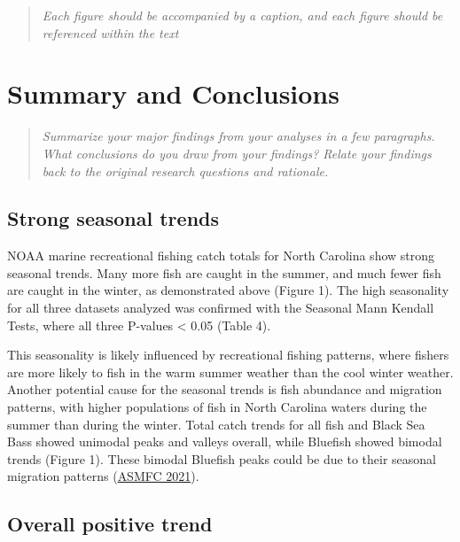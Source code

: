 \documentclass[
  12pt,
]{article}
\begin{document}
\begin{quote}
\emph{Each figure should be accompanied by a caption, and each figure
should be referenced within the text}
\end{quote}

\newpage

\hypertarget{summary-and-conclusions}{%
\section{Summary and Conclusions}\label{summary-and-conclusions}}

\begin{quote}
\emph{Summarize your major findings from your analyses in a few
paragraphs. What conclusions do you draw from your findings? Relate your
findings back to the original research questions and rationale.}
\end{quote}

\hypertarget{strong-seasonal-trends}{%
\subsection{Strong seasonal trends}\label{strong-seasonal-trends}}

NOAA marine recreational fishing catch totals for North Carolina show
strong seasonal trends. Many more fish are caught in the summer, and
much fewer fish are caught in the winter, as demonstrated above (Figure
1). The high seasonality for all three datasets analyzed was confirmed
with the Seasonal Mann Kendall Tests, where all three P-values
\textless{} 0.05 (Table 4).

This seasonality is likely influenced by recreational fishing patterns,
where fishers are more likely to fish in the warm summer weather than
the cool winter weather. Another potential cause for the seasonal trends
is fish abundance and migration patterns, with higher populations of
fish in North Carolina waters during the summer than during the winter.
Total catch trends for all fish and Black Sea Bass showed unimodal peaks
and valleys overall, while Bluefish showed bimodal trends (Figure 1).
These bimodal Bluefish peaks could be due to their seasonal migration
patterns (\href{http://www.asmfc.org/species/bluefish}{ASMFC 2021}).

\hypertarget{overall-positive-trend}{%
\subsection{Overall positive trend}\label{overall-positive-trend}}
\end{document}

